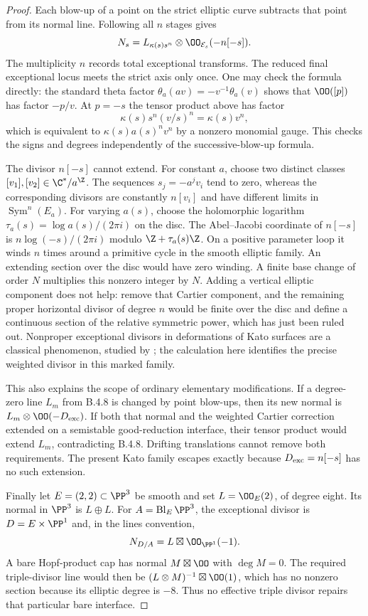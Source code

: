 \begin{proof}
Each blow-up of a point on the strict elliptic curve subtracts that
point from its normal line. Following all $n$ stages gives
\[
 N_s=L_{\kappa(s)s^n}\otimes\OO_{\mathcal E_s}(-n[-s]).
\]
The multiplicity $n$ records total exceptional transforms.
The reduced final exceptional locus meets the strict axis only once.
One may check the formula directly: the standard theta factor
$\theta_a(av)=-v^{-1}\theta_a(v)$ shows that $\OO([p])$
has factor $-p/v$. At $p=-s$ the tensor product above has factor
\[
 \kappa(s)s^n(v/s)^n=\kappa(s)v^n,
\]
which is equivalent to $\kappa(s)a(s)^n v^n$ by a nonzero monomial
gauge. This checks the signs and degrees independently of the
successive-blow-up formula.

The divisor $n[-s]$ cannot extend. For constant $a$, choose two
distinct classes $[v_1],[v_2]\in\C^*/a^\Z$.
The sequences $s_j=-a^jv_i$ tend to zero, whereas the corresponding
divisors are constantly $n[v_i]$ and have different limits in
$\operatorname{Sym}^n(E_a)$.
For varying $a(s)$, choose the holomorphic logarithm
$\tau_a(s)=\log a(s)/(2\pi i)$ on the disc.
The Abel--Jacobi coordinate of $n[-s]$ is
$n\log(-s)/(2\pi i)$ modulo $\Z+\tau_a(s)\Z$.
On a positive parameter loop it winds $n$ times around a primitive
cycle in the smooth elliptic family. An extending section over the
disc would have zero winding. A finite base change of order $N$
multiplies this nonzero integer by $N$.
Adding a vertical elliptic component does not help: remove that
Cartier component, and the remaining proper horizontal divisor of
degree $n$ would be finite over the disc and define a continuous
section of the relative symmetric power, which has just been ruled
out. Nonproper exceptional divisors in deformations of Kato surfaces
are a classical phenomenon, studied by
\citet[Section 1.2]{DlousskyTeleman2012AB}; the calculation here
identifies the precise weighted divisor in this marked family.

This also explains the scope of ordinary elementary modifications.
If a degree-zero line $L_m$ from B.4.8 is changed by point blow-ups,
then its new normal is $L_m\otimes\OO(-D_{\rm exc})$.
If both that normal and the weighted Cartier correction extended on
a semistable good-reduction interface, their tensor product would
extend $L_m$, contradicting B.4.8. Drifting translations cannot
remove both requirements. The present Kato family escapes exactly
because $D_{\rm exc}=n[-s]$ has no such extension.

Finally let $E=(2,2)\subset\PP^3$ be smooth and set
$L=\OO_E(2)$, of degree eight. Its normal in $\PP^3$ is
$L\oplus L$. For $A=\operatorname{Bl}_E\PP^3$, the exceptional
divisor is $D=E\times\PP^1$ and, in the lines convention,
\[
 N_{D/A}=L\boxtimes\OO_{\PP^1}(-1).
\]
A bare Hopf-product cap has normal $M\boxtimes\OO$ with
$\deg M=0$. The required triple-divisor line would then be
$(L\otimes M)^{-1}\boxtimes\OO(1)$, which has no nonzero section
because its elliptic degree is $-8$. Thus no effective triple divisor
repairs that particular bare interface.


\end{proof}
